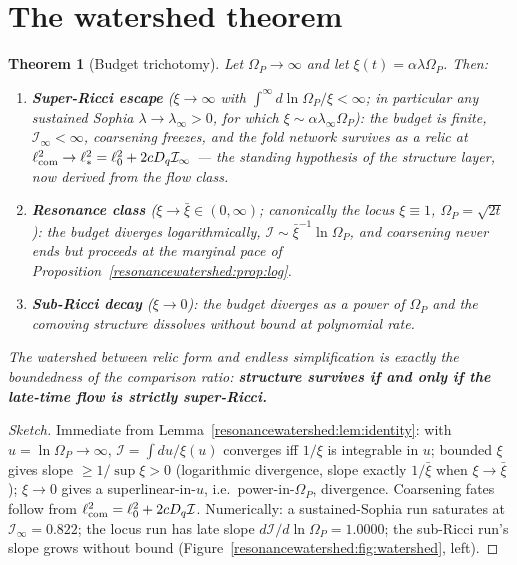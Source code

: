 \documentclass[11pt,a4paper,oneside]{book}
\newcommand{\Op}{\Omega_P}
\newcommand{\Dq}{D_q}
\newcommand{\lcom}{\ell_{\rm com}}
\newcommand{\Ib}{\mathcal I}
\theoremstyle{plain}
\newtheorem{theorem}{Theorem}[chapter]
\theoremstyle{definition}
\theoremstyle{remark}
\begin{document}
\section{The watershed theorem}

\begin{theorem}[Budget trichotomy]\label{resonancewatershed:thm:watershed}
Let $\Op\to\infty$ and let $\xi(t)=\alpha\lambda\Op$. Then:
\begin{enumerate}[label=(\roman*),leftmargin=1.8em,itemsep=2pt]
\item \textbf{Super-Ricci escape} ($\xi\to\infty$ with $\int^\infty d\ln\Op/\xi<\infty$; in particular
any sustained Sophia $\lambda\to\lambda_\infty>0$, for which $\xi\sim\alpha\lambda_\infty\Op$): the
budget is finite, $\Ib_\infty<\infty$, coarsening freezes, and the fold network survives as a
\emph{relic} at $\lcom^2\to\ell_*^2=\ell_0^2+2c\Dq\Ib_\infty$ --- the standing hypothesis of the
structure layer, now derived from the flow class.
\item \textbf{Resonance class} ($\xi\to\bar\xi\in(0,\infty)$; canonically the locus $\xi\equiv1$,
$\Op=\sqrt{2t}$): the budget diverges \emph{logarithmically},
$\Ib\sim\bar\xi^{-1}\ln\Op$, and coarsening never ends but proceeds at the marginal pace of
Proposition~\ref{resonancewatershed:prop:log}.
\item \textbf{Sub-Ricci decay} ($\xi\to0$): the budget diverges as a power of $\Op$ and the comoving
structure dissolves without bound at polynomial rate.
\end{enumerate}
The watershed between relic form and endless simplification is exactly the boundedness of the
comparison ratio: \textbf{structure survives if and only if the late-time flow is strictly
super-Ricci.}
\end{theorem}
\begin{proof}[Sketch]
Immediate from Lemma~\ref{resonancewatershed:lem:identity}: with $u=\ln\Op\to\infty$, $\Ib=\int du/\xi(u)$ converges iff
$1/\xi$ is integrable in $u$; bounded $\xi$ gives slope $\ge1/\sup\xi>0$ (logarithmic divergence,
slope exactly $1/\bar\xi$ when $\xi\to\bar\xi$); $\xi\to0$ gives a superlinear-in-$u$, i.e.\
power-in-$\Op$, divergence. Coarsening fates follow from $\lcom^2=\ell_0^2+2c\Dq\Ib$. Numerically: a
sustained-Sophia run saturates at $\Ib_\infty=0.822$; the locus run has late slope
$d\Ib/d\ln\Op=1.0000$; the sub-Ricci run's slope grows without bound
(Figure~\ref{resonancewatershed:fig:watershed}, left).
\end{proof}
\end{document}
